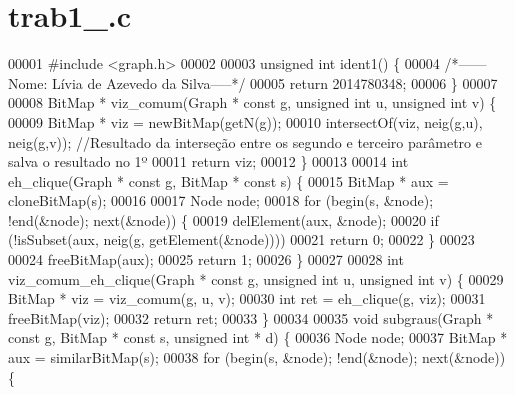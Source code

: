 \section{trab1\+\_.\+c}
\label{trab1__2014780348_8c_source}

\begin{DoxyCode}
00001 \textcolor{preprocessor}{#include <graph.h>}
00002 
00003 \textcolor{keywordtype}{unsigned} \textcolor{keywordtype}{int} ident1() \{
00004         \textcolor{comment}{/*------Nome: Lívia de Azevedo da Silva-----*/}
00005         \textcolor{keywordflow}{return} 2014780348;
00006 \}
00007 
00008 BitMap * viz_comum(Graph * \textcolor{keyword}{const} g, \textcolor{keywordtype}{unsigned} \textcolor{keywordtype}{int} u, \textcolor{keywordtype}{unsigned} \textcolor{keywordtype}{int} v) \{
00009         BitMap * viz = newBitMap(getN(g));
00010         intersectOf(viz, neig(g,u), neig(g,v)); \textcolor{comment}{//Resultado da interseção entre os segundo e terceiro
       parâmetro e salva o resultado no 1º}
00011         \textcolor{keywordflow}{return} viz;
00012 \}
00013 
00014 \textcolor{keywordtype}{int} eh_clique(Graph * \textcolor{keyword}{const} g, BitMap * \textcolor{keyword}{const} s) \{
00015         BitMap * aux = cloneBitMap(s);
00016 
00017         Node node;
00018         \textcolor{keywordflow}{for} (begin(s, &node); !end(&node); next(&node)) \{
00019                 delElement(aux, &node);
00020                 \textcolor{keywordflow}{if} (!isSubset(aux, neig(g, getElement(&node))))
00021                         \textcolor{keywordflow}{return} 0;
00022         \}
00023 
00024         freeBitMap(aux);
00025         \textcolor{keywordflow}{return} 1;
00026 \}
00027 
00028 \textcolor{keywordtype}{int} viz_comum_eh_clique(Graph * \textcolor{keyword}{const} g, \textcolor{keywordtype}{unsigned} \textcolor{keywordtype}{int} u, \textcolor{keywordtype}{unsigned} \textcolor{keywordtype}{int} v) \{
00029         BitMap * viz = viz_comum(g, u, v);
00030         \textcolor{keywordtype}{int} ret = eh_clique(g, viz);
00031         freeBitMap(viz);
00032         \textcolor{keywordflow}{return} ret;
00033 \}
00034 
00035 \textcolor{keywordtype}{void} subgraus(Graph * \textcolor{keyword}{const} g, BitMap * \textcolor{keyword}{const} s, \textcolor{keywordtype}{unsigned} \textcolor{keywordtype}{int} * d) \{
00036         Node node;
00037         BitMap * aux = similarBitMap(s);
00038         \textcolor{keywordflow}{for} (begin(s, &node); !end(&node); next(&node)) \{

\end{DoxyCode}
